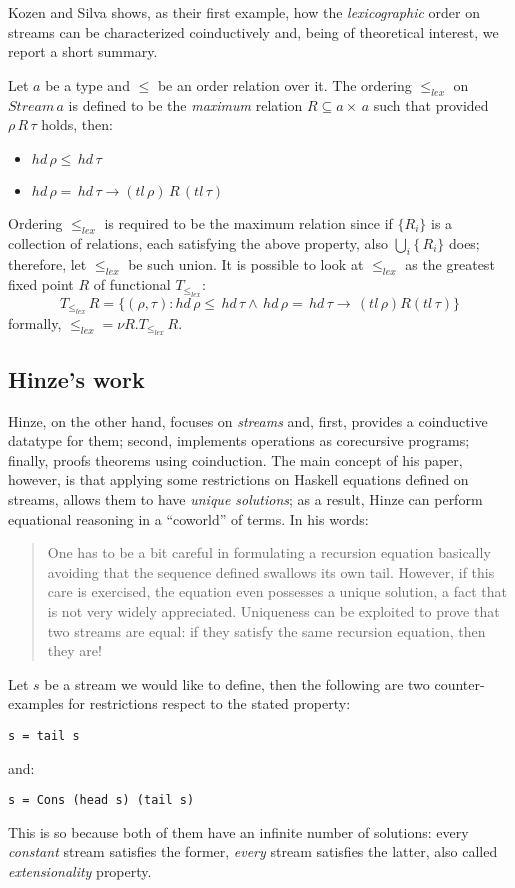 Kozen and Silva shows, as their first example, how the \emph{lexicographic} order
on streams can be characterized coinductively and, being of theoretical interest,
we report a short summary.

Let $a$ be a type and $\leq$ be an order relation over it. The ordering $\leq_{lex}$
on $Stream\,a$ is defined to be the \emph{maximum} relation $R\subseteq a\times\,a$ 
such that provided $\rho\,R\,\tau$ holds, then:
\begin{itemize}
    \item $hd\,\rho\leq\,hd\,\tau$ 
    \item $hd\,\rho=\,hd\,\tau \rightarrow (tl\,\rho)\,R\,(tl\,\tau)$ 
\end{itemize}
Ordering $\leq_{lex}$ is required to be the maximum relation since if 
$\lbrace R_{i}\rbrace$ is a collection of relations, each satisfying the above
property, also $\bigcup_{i}\lbrace\,R_{i}\rbrace$ does; therefore, let $\leq_{lex}$
be such union. It is possible to look at $\leq_{lex}$ as the greatest fixed point $R$
of functional $T_{\leq_{lex}}$:
\begin{displaymath}
    T_{\leq_{lex}}\,R = \lbrace (\rho,\tau) : hd\,\rho \leq\,hd\,\tau\wedge\,
        hd\,\rho=\,hd\,\tau\rightarrow\,(tl\,\rho) R (tl\,\tau) \rbrace
\end{displaymath}
formally, $\leq_{lex} = \nu R. T_{\leq_{lex}}\,R$.

\subsection{Hinze's work}

Hinze, on the other hand, focuses on \emph{streams} and, first, provides a coinductive
datatype for them; second, implements operations as corecursive programs; finally,
proofs theorems using coinduction. The main concept of his paper, however, is that
applying some restrictions on Haskell equations defined on streams, allows them
to have \emph{unique solutions}; as a result, Hinze can perform equational
reasoning in a ``coworld'' of terms. In his words:
\begin{quote}
One has to be a bit careful in formulating a recursion equation 
basically avoiding that the sequence
defined swallows its own tail. However, if this care is exercised,
the equation even possesses a unique solution, a fact that is not
very widely appreciated. Uniqueness can be exploited to prove that
two streams are equal: if they satisfy the same recursion equation,
then they are!
\end{quote}
Let $s$ be a stream we would like to define, then the following are 
two counter-examples for restrictions respect to the stated property:
\begin{verbatim}
s = tail s
\end{verbatim}
and:
\begin{verbatim}
s = Cons (head s) (tail s)
\end{verbatim}
This is so because both of them have an infinite number of solutions:
every \emph{constant} stream satisfies the former, \emph{every} 
stream satisfies the latter, also called \emph{extensionality}
property. 

